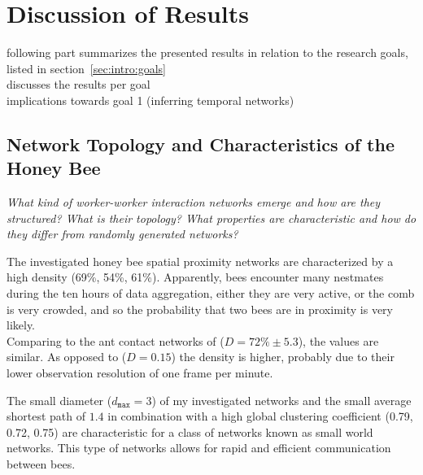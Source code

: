 \section{Discussion of Results}

following part summarizes the presented results in relation to the research goals, listed in section~\ref{sec:intro:goals}\\
discusses the results per goal\\
implications towards goal 1 (inferring temporal networks)\\


\subsection{Network Topology and Characteristics of the Honey Bee}
\emph{What kind of worker-worker interaction networks emerge and how are they structured?
What is their topology?
What properties are characteristic and how do they differ from randomly generated networks?}

The investigated honey bee spatial proximity networks are characterized by a high density (69\%, 54\%, 61\%).
Apparently, bees encounter many nestmates during the ten hours of data aggregation, either they are very active, or the comb is very crowded, and so the probability that two bees are in proximity is very likely.\\
Comparing to the ant contact networks of \textcite{mersch2013tracking} ($D=72\%\pm5.3$), the values are similar.
As opposed to \textcite{baracchi2014socio} ($D=0.15$) the density is higher, probably due to their lower observation resolution of one frame per minute.

The small diameter ($d_{\texttt{max}}=3$) of my investigated networks and the small average shortest path of $1.4$ in combination with a high global clustering coefficient (0.79, 0.72, 0.75) are characteristic for a class of networks known as small world networks.
This type of networks allows for rapid and efficient communication between bees.

